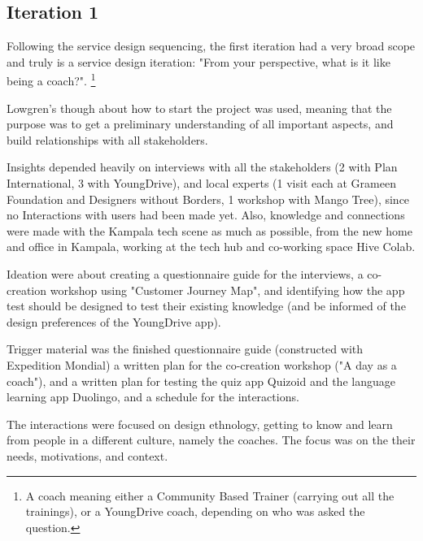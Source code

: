 \subsection{Iteration 1}


Following the service design sequencing, the first iteration had a very broad scope and truly is a service design iteration: "From your perspective, what is it like being a coach?". \footnote{A coach meaning either a Community Based Trainer (carrying out all the trainings), or a YoungDrive coach, depending on who was asked the question.}

Lowgren's though about how to start the project was used, meaning that the purpose was to get a preliminary understanding of all important aspects, and build relationships with all stakeholders.


Insights depended heavily on interviews with all the stakeholders  (2 with Plan International, 3 with YoungDrive), and local experts (1 visit each at Grameen Foundation and Designers without Borders, 1 workshop with Mango Tree), since no Interactions with users had been made yet. Also, knowledge and connections were made with the Kampala tech scene as much as possible, from the new home and office in Kampala, working at the tech hub and co-working space Hive Colab.

Ideation were about creating a questionnaire guide for the interviews, a co-creation workshop using "Customer Journey Map", and identifying how the app test should be designed to test their existing knowledge (and be informed of the design preferences of the YoungDrive app).

Trigger material was the finished questionnaire guide (constructed with Expedition Mondial) a written plan for the co-creation workshop ("A day as a coach"), and a written plan for testing the quiz app Quizoid and the language learning app Duolingo, and a schedule for the interactions.

The interactions were focused on design ethnology, getting to know and learn from people in a different culture, namely the coaches. The focus was on the their needs, motivations, and context.


